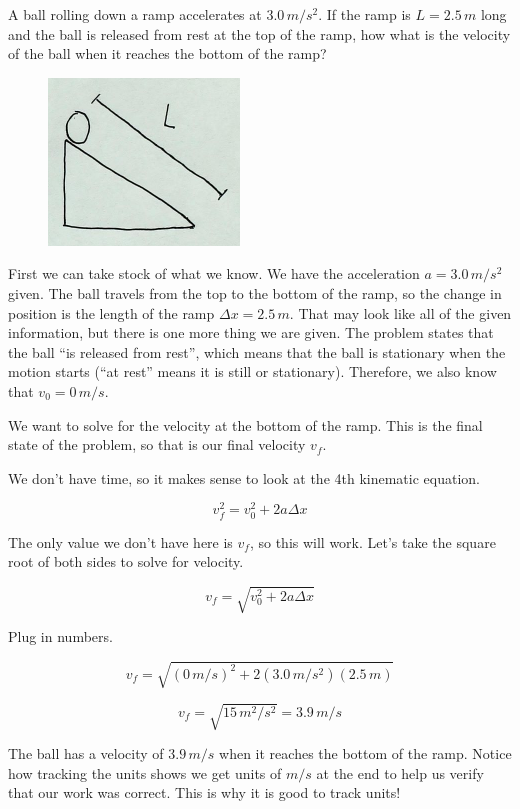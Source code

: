 \documentclass[12pt]{book}
\begin{document}
\begin{exampleblock}

A ball rolling down a ramp accelerates at $3.0 \, m/s^2$. If the ramp is $L = 2.5 \, m$ long and the ball is released from rest at the top of the ramp, how what is the velocity of the ball when it reaches the bottom of the ramp?

\begin{figure}[h]
\centering
\includegraphics[scale=0.8]{example_units_ball_ramp.png}
\end{figure}

\hspace{10pt}

First we can take stock of what we know. We have the acceleration $a = 3.0 \, m/s^2$ given. The ball travels from the top to the bottom of the ramp, so the change in position is the length of the ramp $\Delta x = 2.5 \, m$. That may look like all of the given information, but there is one more thing we are given. The problem states that the ball ``is released from rest'', which means that the ball is stationary when the motion starts (``at rest'' means it is still or stationary). Therefore, we also know that $v_0 = 0 \, m/s$.

We want to solve for the velocity at the bottom of the ramp. This is the final state of the problem, so that is our final velocity $v_f$.

We don't have time, so it makes sense to look at the 4th kinematic equation.

\begin{equation}
v_f^2 = v_0^2 + 2 a \Delta x
\end{equation}

The only value we don't have here is $v_f$, so this will work. Let's take the square root of both sides to solve for velocity.

\begin{equation}
v_f = \sqrt{v_0^2 + 2 a \Delta x}
\end{equation}

Plug in numbers.

\begin{equation}
v_f = \sqrt{(0 \, m/s)^2 + 2 (3.0 \, m/s^2) (2.5 \, m)}
\end{equation}

\begin{equation}
v_f = \sqrt{15 \, m^2 / s^2} = 3.9 \, m/s
\end{equation}

The ball has a velocity of $3.9 \, m/s$ when it reaches the bottom of the ramp. Notice how tracking the units shows we get units of $m/s$ at the end to help us verify that our work was correct. This is why it is good to track units!

\end{exampleblock}
\end{document}
